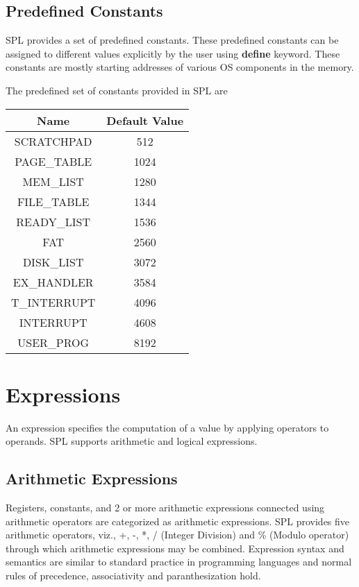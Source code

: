 \documentclass[11pt]{article}
\begin{document}
\subsection{Predefined Constants}
SPL provides a set of predefined constants. These predefined constants can be assigned to different values explicitly by the user using \textbf{define} keyword. These constants are mostly starting addresses of various OS components in the memory.

The predefined set of constants provided in SPL are \\
\begin{center}
\begin{tabular}{| c | c |}
\hline
\textbf{Name} & \textbf{Default Value} \\
\hline
SCRATCHPAD 	& 	512 \\
\hline
PAGE\_TABLE 	& 	1024  \\
\hline
MEM\_LIST 	&	1280 	\\
\hline
FILE\_TABLE 	& 	1344		\\
\hline
READY\_LIST 	& 	1536	\\
\hline
FAT 		& 	2560    \\
\hline
DISK\_LIST 	& 	3072 	\\
\hline
EX\_HANDLER & 	3584	\\
\hline
T\_INTERRUPT & 	4096	\\
\hline
INTERRUPT & 	4608	\\
\hline
USER\_PROG 	& 	8192	\\
\hline

\end{tabular}
\end{center}


\section{Expressions}
An expression specifies the computation of a value by applying operators to operands. SPL supports arithmetic and logical expressions.

\subsection{Arithmetic Expressions}

Registers, constants, and 2 or more arithmetic expressions connected using arithmetic operators are categorized as arithmetic expressions. SPL provides five arithmetic operators, viz., +, -, *, / (Integer Division) and \% (Modulo operator) through which arithmetic expressions may be combined. Expression syntax and semantics are similar to standard practice in programming languages and normal rules of precedence, associativity and paranthesization hold. 
\end{document}
